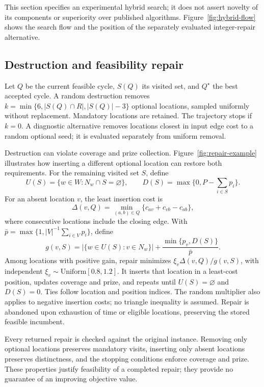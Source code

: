 This section specifies an experimental hybrid search; it does not assert
novelty of its components or superiority over published algorithms.
Figure~\ref{fig:hybrid-flow} shows the search flow and the position of the
separately evaluated integer-repair alternative.


\subsection{Destruction and feasibility repair}
Let $Q$ be the current feasible cycle, $S(Q)$ its visited set, and
$Q^\star$ the best accepted cycle. A random destruction removes
$k=\min\{6,|S(Q)\cap R|,|S(Q)|-3\}$ optional locations, sampled uniformly
without replacement. Mandatory locations are retained. The trajectory stops
if $k=0$. A diagnostic alternative removes locations closest in input edge
cost to a random optional seed; it is evaluated separately from uniform removal.

Destruction can violate coverage and prize collection.
Figure~\ref{fig:repair-example} illustrates how inserting a different optional
location can restore both requirements. For the remaining visited set $S$, define
\[
 U(S)=\{w\in W:N_w\cap S=\varnothing\},\qquad
 D(S)=\max\{0,P-\sum_{i\in S}p_i\}.
\]
For an absent location $v$, the least insertion cost is
\[
 \Delta(v,Q)=\min_{(a,b)\in Q}\{c_{av}+c_{vb}-c_{ab}\},
\]
where consecutive locations include the closing edge. With
$\bar p=\max\{1,|V|^{-1}\sum_{i\in V}p_i\}$, define
\[
 g(v,S)=|\{w\in U(S):v\in N_w\}|+
                     \frac{\min\{p_v,D(S)\}}{\bar p}.
\]
Among locations with positive gain, repair minimizes
$\xi_v\Delta(v,Q)/g(v,S)$, with independent
$\xi_v\sim\mathrm{Uniform}[0.8,1.2]$. It inserts that location in a
least-cost position, updates coverage and prize, and repeats until
$U(S)=\varnothing$ and $D(S)=0$. Ties follow location and position indices.
The random multiplier also applies to negative insertion costs; no triangle
inequality is assumed. Repair is abandoned upon exhaustion of time or eligible
locations, preserving the stored feasible incumbent.

Every returned repair is checked against the original instance. Removing
only optional locations preserves mandatory visits, inserting only absent
locations preserves distinctness, and the stopping conditions enforce
coverage and prize. These properties justify feasibility of a completed
repair; they provide no guarantee of an improving objective value.

